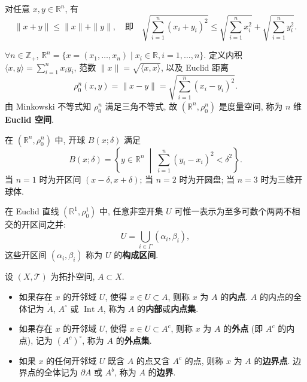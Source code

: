 \begin{lemma}\label{lem:7.1.4}
对任意 $x, y \in \mathbb{R}^n$, 有
\[
  \|x + y\| \leqslant \|x\| + \|y\|, \quad\text{即}\quad
  \sqrt{\sum_{i=1}^n (x_i + y_i)^2} \leqslant \sqrt{\sum_{i=1}^n x_i^2} + \sqrt{\sum_{i=1}^n y_i^2}.
\]
\end{lemma}

\begin{example}\label{ex:7.1.7}
$\forall n \in \mathbb{Z}_+$, $\mathbb{R}^n = \{x = (x_1, \dots, x_n) \mid x_i \in \mathbb{R}, i = 1, \dots, n\}$. 定义内积 $\langle x, y \rangle = \sum_{i=1}^n x_i y_i$, 范数 $\|x\| = \sqrt{\langle x, x \rangle}$, 以及 Euclid 距离
\[
  \rho_0^n(x, y) = \|x - y\| = \sqrt{\sum_{i=1}^n (x_i - y_i)^2}.
\]
由 Minkowski 不等式知 $\rho_0^n$ 满足三角不等式, 故 $(\mathbb{R}^n, \rho_0^n)$ 是度量空间, 称为 $n$ 维 \textbf{Euclid 空间}.
\end{example}

\begin{example}\label{ex:7.1.8}
在 $(\mathbb{R}^n, \rho_0^n)$ 中, 开球 $B(x; \delta)$ 满足
\[
  B(x; \delta) = \left\{y \in \mathbb{R}^n \;\middle|\; \sum_{i=1}^n (y_i - x_i)^2 < \delta^2\right\}.
\]
当 $n = 1$ 时为开区间 $(x - \delta, x + \delta)$; 当 $n = 2$ 时为开圆盘; 当 $n = 3$ 时为三维开球体.
\end{example}

\begin{example}[开集的构成区间]\label{ex:7.1.9}
在 Euclid 直线 $(\mathbb{R}^1, \rho_0^1)$ 中, 任意非空开集 $U$ 可惟一表示为至多可数个两两不相交的开区间之并:
\[
  U = \bigcup_{i \in \Gamma} (\alpha_i, \beta_i),
\]
这些开区间 $(\alpha_i, \beta_i)$ 称为 $U$ 的\textbf{构成区间}.
\end{example}

\begin{definition}\label{def:7.1.7}
设 $(X, \mathcal{T})$ 为拓扑空间, $A \subset X$.
\begin{itemize}
  \item 如果存在 $x$ 的开邻域 $U$, 使得 $x \in U \subset A$, 则称 $x$ 为 $A$ 的\textbf{内点}. $A$ 的内点的全体记为 $\mathring{A}$, $A^\circ$ 或 $\operatorname{Int} A$, 称为 $A$ 的\textbf{内部}或\textbf{内点集}.
  \item 如果存在 $x$ 的开邻域 $U$, 使得 $x \in U \subset A^c$, 则称 $x$ 为 $A$ 的\textbf{外点} (即 $A^c$ 的内点), 记为 $(A^c)^\circ$, 称为 $A$ 的\textbf{外点集}.
  \item 如果 $x$ 的任何开邻域 $U$ 既含 $A$ 的点又含 $A^c$ 的点, 则称 $x$ 为 $A$ 的\textbf{边界点}. 边界点的全体记为 $\partial A$ 或 $A^b$, 称为 $A$ 的\textbf{边界}.
\end{itemize}
\end{definition}

